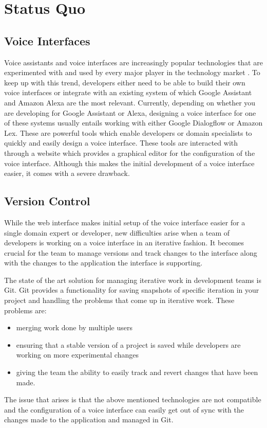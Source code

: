 \chapter{Status Quo}
\section{Voice Interfaces}
Voice assistants and voice interfaces are increasingly popular technologies that are experimented with and used by every major player in the technology market \citeNeeded. To keep up with this trend, developers either need to be able to build their own voice interfaces or integrate with an existing system of which Google Assistant and Amazon Alexa are the most relevant. \citeNeeded
Currently, depending on whether you are developing for Google Assistant or Alexa, designing a voice interface for one of these systems usually entails working with either Google Dialogflow or Amazon Lex. These are powerful tools which enable developers or domain specialists to quickly and easily design a voice interface.
These tools are interacted with through a website which provides a graphical editor for the configuration of the voice interface. Although this makes the initial development of a voice interface easier, it comes with a severe drawback.

\section{Version Control}
While the web interface makes initial setup of the voice interface easier for a single domain expert or developer, new difficulties arise when a team of developers is working on a voice interface in an iterative fashion. It becomes crucial for the team to manage versions and track changes to the interface along with the changes to the application the interface is supporting. \citeNeeded

The state of the art solution for managing iterative work in development teams is Git. \citeNeeded
Git provides a functionality for saving snapshots of specific iteration in your project and handling the problems that come up in iterative work.
These problems are:
\begin{itemize}
    \item merging work done by multiple users
    \item ensuring that a stable version of a project is saved while developers are working on more experimental changes
    \item giving the team the ability to easily track and revert changes that have been made.
\end{itemize}
The issue that arises is that the above mentioned technologies are not compatible and the configuration of a voice interface can easily get out of sync with the changes made to the application and managed in Git. \citeNeeded

